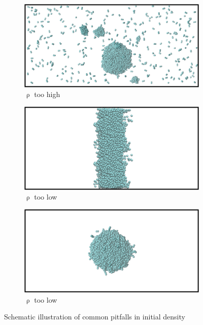 \documentclass[9pt,bestpractices]{livecoms}
\begin{document}
\begin{figure}
	\centering
	\begin{subfigure}{0.2\textwidth} %
    \includegraphics[width=1\textwidth]{gfx/image70.png} 
    \caption{${\uprho}$ too high}
	\end{subfigure}
	\begin{subfigure}{0.2\textwidth} %
    \includegraphics[width=1\textwidth]{gfx/image71.png}
    \caption{${\uprho}$ too low}
	\end{subfigure}
	\begin{subfigure}{0.2\textwidth} %
    \includegraphics[width=1\textwidth]{gfx/image72.png}
    \caption{${\uprho}$ too low}
	\end{subfigure}
\caption{Schematic illustration of common pitfalls in initial density}
\label{fig:23}
\end{figure}
\end{document}
